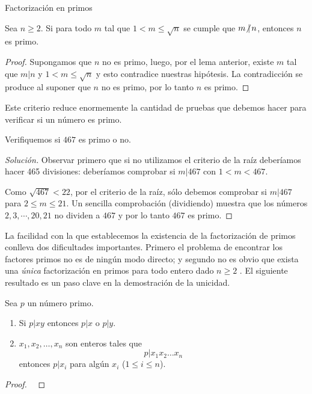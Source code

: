 \begin{section}{Factorización en primos}
\begin{proposicion}\label{craiz}Sea $n\ge 2$. Si para todo $m$ tal que $1<m \le \sqrt{n}$ se cumple que $m{\operatorname{\not|\,} }n$, entonces $n$ es primo.
\end{proposicion}
 \begin{proof}  Supongamos que $n$ no es primo, luego, por el lema anterior, existe $m$ tal que  $m|n$ y $1 < m \le \sqrt n$ y esto contradice nuestras hipótesis. La contradicción se produce al suponer que $n$ no es primo, por lo tanto $n$ es primo. 
\end{proof}

Este criterio reduce enormemente la cantidad de pruebas que debemos hacer para verificar si un número es primo.

\begin{ejemplo*} Verifiquemos si $467$ es primo o no.
\end{ejemplo*}
\begin{proof}[Solución]
     Observar primero que si no utilizamos el criterio de la raíz deberíamos hacer 465 divisiones: deberíamos comprobar si $m|467$ con  $1<m <467$. 
    
    Como $\sqrt{467} < 22$, por el criterio de la raíz, sólo debemos comprobar si $m|467$ para $2\le m \le 21$. Un sencilla comprobación (dividiendo) muestra que los números $2,3,\cdots,20,21$ no  dividen a $467$ y por  lo tanto $467$ es primo.
\end{proof}



La facilidad con la que establecemos la existencia de la factorización de primos conlleva dos dificultades importantes. Primero el problema de encontrar los factores primos no es de ningún modo directo; y segundo no es obvio que exista una \textit{única} factorización en primos para todo entero dado $n\ge 2$ . El siguiente resultado es un paso clave en la demostración de la unicidad.

\begin{teorema}\label{t1.8} Sea $p$  un número  primo.

\begin{enumerate}[label=\textit{\alph*)}]
\item\label{it.pirreducible_a} Si $p|xy$ entonces $p|x$ o $p|y$.
\item\label{it.pirreducible_b} $x_1,x_2,\ldots,x_n$ son enteros tales que
$$
p|x_1x_2\ldots x_n
$$
entonces $p|x_i$ para algún $x_i$ ($1\le i \le n$).
\end{enumerate}
\end{teorema}
\begin{proof}
\


\end{proof}
\end{section}
